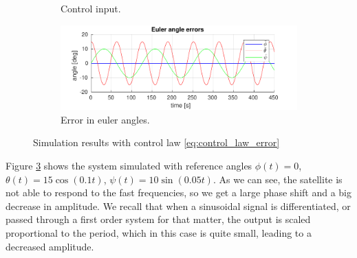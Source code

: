 \begin{figure}[H]
\begin{subfigure}[b]{0.45\textwidth}
		\caption{Control input.}
		\label{fig:5c}
	\end{subfigure}
	\begin{subfigure}[b]{0.45\textwidth}
		\includegraphics[width=\textwidth]{../matlab/1_5_euler_angle_errors}
		\caption{Error in euler angles.}
		\label{fig:5d}
	\end{subfigure}
	\caption{Simulation results with control law \eqref{eq:control_law_error}}\label{fig:error_control_law}
\end{figure}
Figure \ref{fig:error_control_law} shows the system simulated with reference angles $\phi(t) = 0$, $\theta(t) = 15\cos(0.1t)$, $\psi(t) = 10\sin(0.05t)$. As we can see, the satellite is not able to respond to the fast frequencies, so we get a large phase shift and a big decrease in amplitude. We recall that when a sinusoidal signal is differentiated, or passed through a first order system for that matter, the output is scaled proportional to the period, which in this case is quite small, leading to a decreased amplitude.

